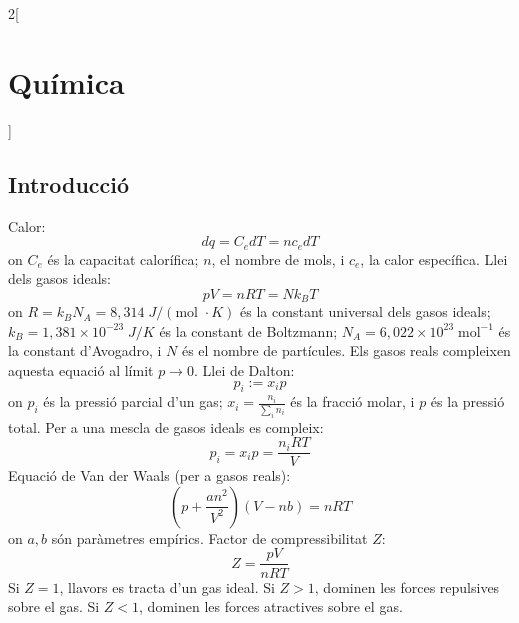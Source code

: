 \documentclass[../../../main.tex]{subfiles}
\begin{document}
\begin{multicols}{2}[\section{Química}]
\subsection{Introducció}
Calor: $$dq=C_edT=nc_edT$$ {\footnotesize on $C_e$ és la capacitat calorífica; $n$, el nombre de mols, i $c_e$, la calor específica.}\newline
Llei dels gasos ideals: $$pV=nRT=Nk_BT$$ {\footnotesize on $R=k_BN_A=8,314\;J/(\text{mol }\cdot K)$ és la cons\-tant universal dels gasos ideals; $k_B=1,381\times 10^{-23}\;J/K$ és la constant de Boltzmann; $N_A=6,022\times10^{23}\;\text{mol}^{-1}$ és la constant d'Avogadro, i $N$ és el nombre de partícules. Els gasos reals compleixen aquesta equació al límit $p\to 0$.}\newline
Llei de Dalton: $$p_i:=x_ip$$ {\footnotesize on $p_i$ és la pressió parcial d'un gas; $x_i=\frac{n_i}{\sum_in_i}$ és la fracció molar, i $p$ és la pressió total.}\newline
Per a una mescla de gasos ideals es compleix: $$p_i=x_ip=\frac{n_iRT}{V}$$
Equació de Van der Waals (per a gasos reals): $$\left(p+\frac{an^2}{V^2}\right)\left(V-nb\right)=nRT$$ {\footnotesize on $a,b$ són paràmetres empírics.}\newline
Factor de compressibilitat $Z$: $$Z=\frac{pV}{nRT}$$ {\footnotesize Si $Z=1$, llavors es tracta d'un gas ideal. Si $Z>1$, dominen les forces repulsives sobre el gas. Si $Z<1$, dominen les forces atractives sobre el gas.}

\end{multicols}
\end{document}
